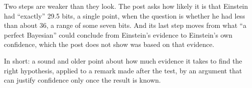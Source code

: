 \begin{afterword}
Two steps are weaker than they look. The post asks how likely it is that Einstein had ``exactly'' 29.5 bits, a single point, when the question is whether he had less than about 36, a range of some seven bits. And its last step moves from what ``a perfect Bayesian'' could conclude from Einstein's evidence to Einstein's own confidence, which the post does not show was based on that evidence.

In short: a sound and older point about how much evidence it takes to find the right hypothesis, applied to a remark made after the test, by an argument that can justify confidence only once the result is known.
\end{afterword}
